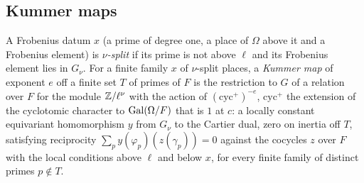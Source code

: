 \subsection{Kummer maps}\label{ss:kummer-maps}
A Frobenius datum $x$ (a prime of degree one, a place of $\Omega$ above it and a Frobenius element) is \emph{$\nu$-split} if its prime is not above $\ell$ and its Frobenius element lies in $G_\nu$. For a finite family $x$ of $\nu$-split places,
a \emph{Kummer map} of exponent $e$ off a finite set $T$ of primes of $F$ is the restriction to $G$ of a relation over $F$ for the module $\mathbb{Z}/\ell^\nu$ with the action of $(\mathrm{cyc}^+)^{-e}$, $\mathrm{cyc}^+$ the extension of the cyclotomic
character to $\operatorname{Gal}(\Omega/F)$ that is $1$ at $c$: a locally constant equivariant homomorphism $y$ from $G_\nu$ to the Cartier dual, zero on inertia off $T$, satisfying reciprocity $\sum_py(\varphi_p)(z(\gamma_p))=0$ against the
cocycles $z$ over $F$ with the local conditions above $\ell$ and below $x$, for every finite family of distinct primes $p\notin T$.
